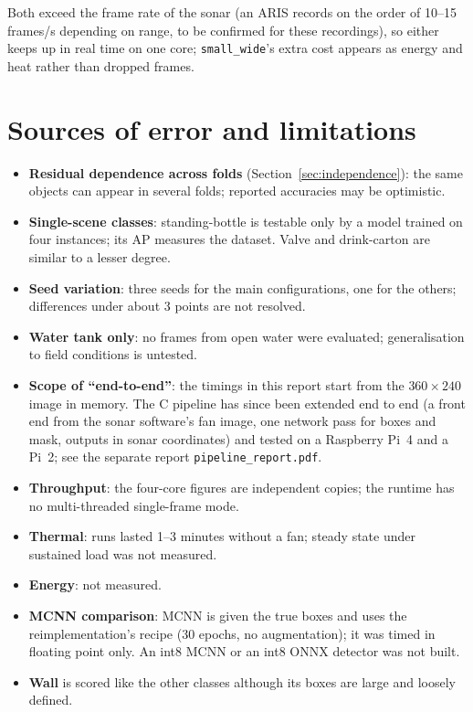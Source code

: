 \documentclass[11pt,a4paper]{article}
\newcommand{\cfg}[1]{\texttt{#1}}
\begin{document}
Both exceed the frame rate of the sonar (an ARIS records on the order of
10--15 frames/s depending on range, to be confirmed for these recordings),
so either keeps up in real time on one core; \cfg{small\_wide}'s extra cost
appears as energy and heat rather than dropped frames.

\section{Sources of error and limitations}

\begin{itemize}
  \item \textbf{Residual dependence across folds} (Section~\ref{sec:independence}):
        the same objects can appear in several folds; reported accuracies may
        be optimistic.
  \item \textbf{Single-scene classes}: standing-bottle is testable only by a
        model trained on four instances; its AP measures the dataset.
        Valve and drink-carton are similar to a lesser degree.
  \item \textbf{Seed variation}: three seeds for the main configurations,
        one for the others; differences under about 3 points are not
        resolved.
  \item \textbf{Water tank only}: no frames from open water were evaluated;
        generalisation to field conditions is untested.
  \item \textbf{Scope of ``end-to-end''}: the timings in this report start
        from the $360 \times 240$ image in memory. The C pipeline has since
        been extended end to end (a front end from the sonar software's fan
        image, one network pass for boxes and mask, outputs in sonar
        coordinates) and tested on a Raspberry Pi~4 and a Pi~2; see the
        separate report \texttt{pipeline\_report.pdf}.
  \item \textbf{Throughput}: the four-core figures are independent copies;
        the runtime has no multi-threaded single-frame mode.
  \item \textbf{Thermal}: runs lasted 1--3 minutes without a fan; steady
        state under sustained load was not measured.
  \item \textbf{Energy}: not measured.
  \item \textbf{MCNN comparison}: MCNN is given the true boxes and uses the
        reimplementation's recipe (30 epochs, no augmentation); it was timed
        in floating point only. An int8 MCNN or an int8 ONNX detector was not
        built.
  \item \textbf{Wall} is scored like the other classes although its boxes
        are large and loosely defined.
\end{itemize}
\end{document}
